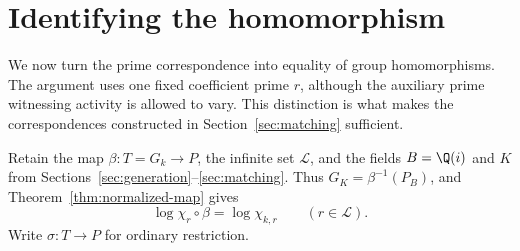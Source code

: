 \section{Identifying the homomorphism}\label{sec:identification}

We now turn the prime correspondence into equality of group homomorphisms. The argument uses one fixed coefficient prime $r$, although the auxiliary prime witnessing activity is allowed to vary. This distinction is what makes the correspondences constructed in Section~\ref{sec:matching} sufficient.

Retain the map $\beta:T=G_k\to P$, the infinite set $\mathcal L$, and the fields $B=\Q(i)$ and $K$ from Sections~\ref{sec:generation}--\ref{sec:matching}. Thus $G_K=\beta^{-1}(P_B)$, and Theorem~\ref{thm:normalized-map} gives
\begin{equation}\label{eq:fixed-r-log}
 \log\chi_r\circ\beta=\log\chi_{k,r}\qquad(r\in\mathcal L).
\end{equation}
Write $\sigma:T\to P$ for ordinary restriction.

